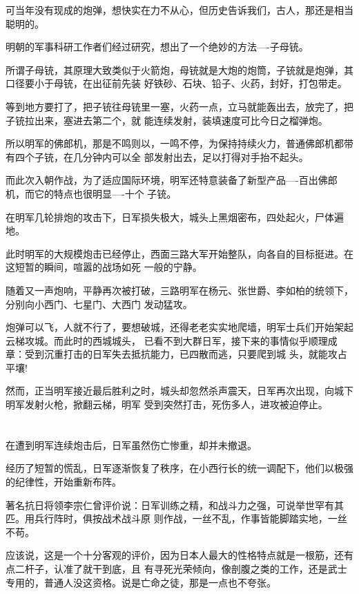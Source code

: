 \documentclass[11pt,a4paper,onecolumn]{article}
\begin{document}
可当年没有现成的炮弹，想快实在力不从心，但历史告诉我们，古人，那还是相当聪明的。

明朝的军事科研工作者们经过研究，想出了一个绝妙的方法----子母铳。

所谓子母铳，其原理大致类似于火箭炮，母铳就是大炮的炮筒，子铳就是炮弹，其口径要小于母铳，在出征前先装
好铁砂、石块、铅子、火药，封好，打包带走。

等到地方要打了，把子铳往母铳里一塞，火药一点，立马就能轰出去，放完了，把子铳拉出来，塞进去第二个，就
能连续发射，装填速度可比今日之榴弹炮。

所以明军的佛郎机，那是不鸣则以，一鸣不停，为保持持续火力，普通佛郎机都带有四个子铳，在几分钟内可以全
部发射出去，足以打得对手抬不起头。

而此次入朝作战，为了适应国际环境，明军还特意装备了新型产品----百出佛郎机，而它的特点也很明显----十个
子铳。

在明军几轮排炮的攻击下，日军损失极大，城头上黑烟密布，四处起火，尸体遍地。

此时明军的大规模炮击已经停止，西面三路大军开始整队，向各自的目标挺进。在这短暂的瞬间，喧嚣的战场如死
一般的宁静。

随着又一声炮响，平静再次被打破，三路明军在杨元、张世爵、李如柏的统领下，分别向小西门、七星门、大西门
发动猛攻。

炮弹可以飞，人就不行了，要想破城，还得老老实实地爬墙，明军士兵们开始架起云梯攻城。而此时的西城城头，
已看不到大群日军，接下来的事情似乎顺理成章：受到沉重打击的日军失去抵抗能力，已四散而逃，只要爬到城
头，就能攻占平壤!

然而，正当明军接近最后胜利之时，城头却忽然杀声震天，日军再次出现，向城下明军发射火枪，掀翻云梯，明军
受到突然打击，死伤多人，进攻被迫停止。

\section[\thesection]{}

在遭到明军连续炮击后，日军虽然伤亡惨重，却并未撤退。

经历了短暂的慌乱，日军逐渐恢复了秩序，在小西行长的统一调配下，他们以极强的纪律性，开始重新布阵。

著名抗日将领李宗仁曾评价说：日军训练之精，和战斗力之强，可说举世罕有其匹。用兵行阵时，俱按战术战斗原
则作战，一丝不乱，作事皆能脚踏实地，一丝不苟。

应该说，这是一个十分客观的评价，因为日本人最大的性格特点就是一根筋，还有点二杆子，认准了就干到底，且
有寻死光荣倾向，像剖腹之类的工作，还是武士专用的，普通人没这资格。说是亡命之徒，那是一点也不夸张。
\end{document}
